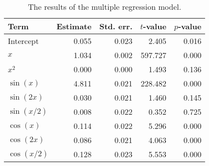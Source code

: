 \begin{table}[!h]

\caption{\label{tab:multiple-regression}The results of the multiple regression model.}
\centering
\begin{tabular}{lrrrr}
\toprule
Term & Estimate & Std. err. & \(t\)-value & \(p\)-value\\
\midrule
Intercept & 0.055 & 0.023 & 2.405 & 0.016\\
\(x\) & 1.034 & 0.002 & 597.727 & 0.000\\
\(x^2\) & 0.000 & 0.000 & 1.493 & 0.136\\
\(\sin(x)\) & 4.811 & 0.021 & 228.482 & 0.000\\
\(\sin(2x)\) & 0.030 & 0.021 & 1.460 & 0.145\\
\(\sin(x/2)\) & 0.008 & 0.022 & 0.352 & 0.725\\
\(\cos(x)\) & 0.114 & 0.022 & 5.296 & 0.000\\
\(\cos(2x)\) & 0.086 & 0.021 & 4.063 & 0.000\\
\(\cos(x/2)\) & 0.128 & 0.023 & 5.553 & 0.000\\
\bottomrule
\end{tabular}
\end{table}